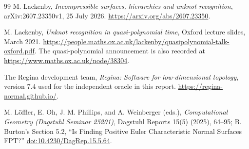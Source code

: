 \documentclass[11pt]{article}
\theoremstyle{definition}
\theoremstyle{remark}
\begin{document}
\begin{thebibliography}{99}
M. Lackenby,
\emph{Incompressible surfaces, hierarchies and unknot recognition},
arXiv:2607.23350v1, 25 July 2026.
\url{https://arxiv.org/abs/2607.23350}.

M. Lackenby,
\emph{Unknot recognition in quasi-polynomial time},
Oxford lecture slides, March 2021.
\url{https://people.maths.ox.ac.uk/lackenby/quasipolynomial-talk-oxford.pdf}.
The quasi-polynomial announcement is also recorded at
\url{https://www.maths.ox.ac.uk/node/38304}.

The Regina development team,
\emph{Regina: Software for low-dimensional topology},
version 7.4 used for the independent oracle in this report.
\url{https://regina-normal.github.io/}.

M. L\"offler, E. Oh, J. M. Phillips, and A. Weinberger (eds.),
\emph{Computational Geometry (Dagstuhl Seminar 25201)},
Dagstuhl Reports 15(5) (2025), 64--95;
B. Burton's Section 5.2, ``Is Finding Positive Euler Characteristic Normal
Surfaces FPT?''
\href{https://doi.org/10.4230/DagRep.15.5.64}{doi:10.4230/DagRep.15.5.64}.

\end{thebibliography}
\end{document}
